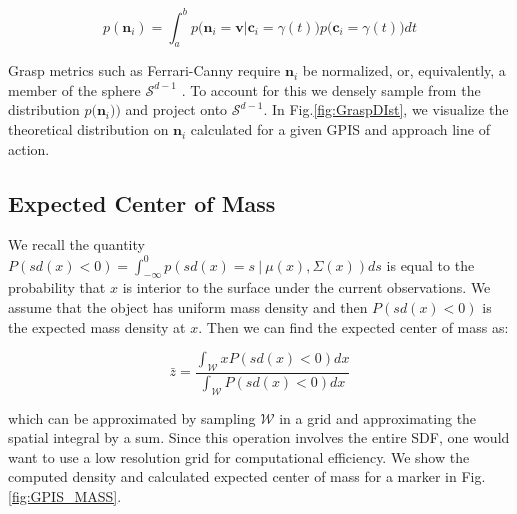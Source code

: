 \documentclass[letterpaper, 10 pt, conference]{ieeeconf}  %
\begin{document}
\vspace{-2ex}
\begin{equation}
p(\textbf{n}_i ) = \int_a^b   p\big(\textbf{n}_i = \textbf{v} | \textbf{c}_i = \gamma(t) \big)p\big(\textbf{c}_i = \gamma(t)\big) dt
\end{equation}

Grasp metrics such as  Ferrari-Canny require $\textbf{n}_i$ be normalized, or, equivalently, a member of the sphere $\mathcal{S}^{d-1}$ \cite{ferrari1992}. To account for this we densely sample from the  distribution $p \big(\textbf{n}_i ) \big)$  and project onto $\mathcal{S}^{d-1}$.  In Fig.\ref{fig:GraspDIst}, we visualize the theoretical distribution on $\textbf{n}_i$ calculated for a given GPIS and approach line of action.


\subsection{Expected Center of Mass}\label{sec:mass} 

We recall the quantity $P(sd(x) < 0) = \int_{-\infty}^{0} p(sd(x) =  s \ | \ \mu(x),\Sigma(x)) ds$ is equal to the probability that $x$ is interior to the surface under the current observations.
We assume that the object has uniform mass density and then $P(sd(x) < 0)$ is the expected mass density at $x$.
Then we can find the expected center of mass as:

\begin{equation}
  \bar{z} 
  =
  \frac
    {\int_{\mathcal{W}}x P(sd(x)<0) dx}
    {\int_{\mathcal{W}}  P(sd(x)<0) dx}
\end{equation}

which can be approximated by sampling $\mathcal{W}$ in a grid and approximating the spatial integral by a sum. Since this operation involves the entire SDF, one would want to use a low resolution grid for computational efficiency. We show the computed density and calculated expected center of mass for a marker in Fig. \ref{fig:GPIS_MASS}.
\end{document}
